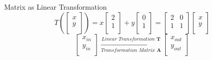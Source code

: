 \documentclass{beamer}
\begin{document}
\begin{frame}{Matrix as Linear Transformation}
\begin{equation*}
T\left(\left[ \begin{array}{c}
	x\\
	y\\
\end{array}\right]\right)=x\left[ \begin{array}{c}
	2\\
	1\\
\end{array}\right]+y\left[ \begin{array}{c}
	0\\
	1\\
\end{array} \right]=\left[ \begin{matrix}
	2&		0\\
	1&		1\\
\end{matrix} \right] \left[ \begin{array}{c}
	x\\
	y\\
\end{array} \right]
\end{equation*}
\vspace{5pt}
\begin{equation*}
    \left[ \begin{array}{c}
        x_{in}\\
        y_{in}\\
    \end{array} \right] \xrightarrow[Transformation\,\,Matrix\,\,\boldsymbol{A}]{Linear\,\,Transformation\,\,\boldsymbol{T}}\left[ \begin{array}{c}
        x_{out}\\
        y_{out}\\
    \end{array} \right]
\end{equation*}

\end{frame}
\end{document}

